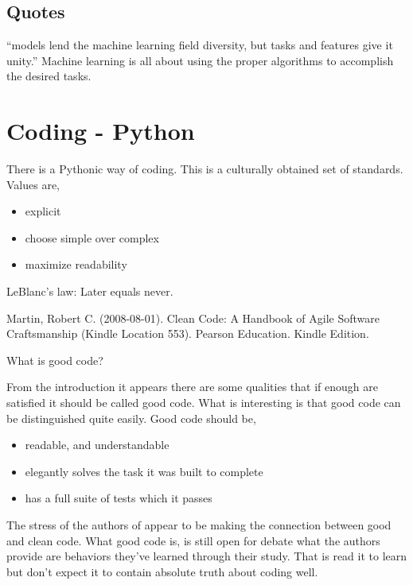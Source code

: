 \documentclass[11pt,letterpaper,oneside]{memoir}
\theoremstyle{definition}
\newtheorem{defn}{Definition}
\begin{document}
\section{Quotes}

``models lend the machine learning field diversity, but tasks and features give it unity.'' \cite[p. 13]{Flach2012}
Machine learning is all about using the proper algorithms to accomplish the desired \glspl{task}.
\begin{comment}
\begin{defn}[Task]
  \label{defn:task}
  An abstract representation of a problem we want to solve regarding the domain objects of import.
\end{defn}
\end{comment}

\chapter{Coding - Python}
There is a Pythonic way of coding.  This is a culturally obtained set of standards.  Values are,

\begin{itemize}
  \item explicit
  \item choose simple over complex
  \item maximize readability
\end{itemize}

LeBlanc's law: Later equals never.

Martin, Robert C. (2008-08-01). Clean Code: A Handbook of Agile Software Craftsmanship (Kindle Location 553). Pearson Education. Kindle Edition. 

What is good code?

From the introduction it appears there are some qualities that if enough are satisfied it should be called good code.  What is interesting is that good code can be distinguished quite easily.  Good code should be,

\begin{itemize}
  \item readable, and understandable
  \item elegantly solves the task it was built to complete 
  \item has a full suite of tests which it passes
\end{itemize}
The stress of the authors of \cite{martin2009clean} appear to be making the connection between good and clean code.  What good code is, is still open for debate what the authors provide are behaviors they've learned through their study.  That is read it to learn but don't expect it to contain absolute truth about coding well.
\end{document}
